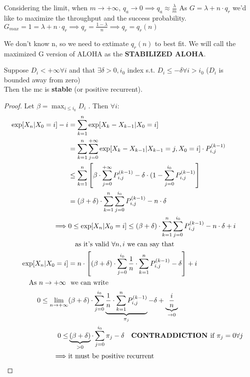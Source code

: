 Considering the limit, when $m \to +\infty$, $q_a \to 0 \implies q_a \approx \frac{\lambda}{m}$
As $G=\lambda + n \cdot q_r$ we'd like to maximize the throughput and the success probability.
$G_{max}=1 = \lambda + n  \cdot q_r \implies q_r = \frac{1-\lambda}{n} \implies q_r = q_r(n)$

We don't know n, so we need to extimate $q_r(n)$ to best fit. We will call the maximized G version
of ALOHA as the \textbf{STABILIZED ALOHA}.

\begin{lemma}
  Suppose $D_i < +\infty \forall i$ and that $\exists \delta > 0 , i_0$ index s.t.
  $D_i \le - \delta \forall i > i_0$ ($D_i$ is bounded away from zero)\\
  Then the  \gls{mc} is \textbf{stable} (or positive recurrent).
  \begin{proof}
    Let $\beta = \max_{i \le i_0} D_i$ . Then $\forall i$:
    \begin{equation}\begin{split}
      \exp[X_n | X_0 = i] -i &= \sum\limits_{k=1}^n \exp[X_k - X_{k-1}|X_0 = i] \\
      &= \sum\limits_{k=1}^n \sum\limits_{j=0}^{+\infty} \exp[X_k - X_{k-1}|X_{k-1} = j , X_0 = i ] \cdot P_{i,j}^{(k-1)}\\
      & \le \sum\limits_{k=1}^{n} \left[\beta \cdot \sum\limits_{j=0}^{+\infty} P_{i,j}^{(k-1)} - \delta \cdot (1- \sum\limits_{j=0}^{i_0} P_{i,j}^{(k-1)}\right]\\
       &= (\beta + \delta) \cdot \sum\limits_{k=1}^n \sum\limits_{j=0}^{i_0} P_{i,j}^{(k-1)} - n \cdot \delta \\
       \implies & 0 \le \exp[X_n | X_0 = i] \le (\beta + \delta) \cdot \sum\limits_{k=1}^n \sum\limits_{j=0}^{i_0} P_{i,j}^{(k-1)} - n \cdot \delta +i\\
       & \quad \text{as it's valid $\forall n , i$ we can say that} \\
       \exp[X_n | X_0 = i] &= n \cdot \left[(\beta + \delta) \cdot \sum\limits_{j=0}^{i_0} \frac{1}{n} \cdot \sum\limits_{k=1}^{n} P_{i,j}^{(k-1)} - \delta \right] +i\\
    \text{As $n \to +\infty$ } & \text{ we can write}\\
    0 \le \lim_{n \to +\infty} &(\beta + \delta) \cdot\sum\limits_{j=0}^{i_0} \underbrace {\frac{1}{n} \cdot \sum\limits_{k=1}^{n} P_{i,j}^{(k-1)}}_{\pi_j} - \delta + \underbrace{\frac{i}{n}}_{\to 0}\\
    0 \le &\underbrace{(\beta + \delta)}_{>0} \cdot \sum\limits_{j=0}^{i_0} \pi_j - \delta \quad \text{\textbf{CONTRADDICTION }if } \pi_j = 0 \forall j \\
    \implies & \text{it must be positive recurrent}
    \end{split}\end{equation}
  \end{proof}
\end{lemma}
